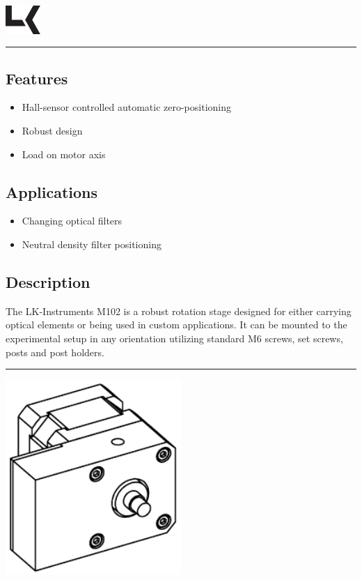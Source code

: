 \documentclass[a4paper, final, 12pt, oneside]{scrartcl}
\numberwithin{equation}{section}
\numberwithin{table}{section}
\numberwithin{figure}{section}
\begin{document}
\thispagestyle{empty}
\includegraphics[width=0.1\textwidth]{../general/logo_black.pdf}
\hfill {\Huge \textbf{\textsf{\productName}}} \hfill {\Huge \textbf{\textsf{\productNumber}}}\\
\noindent\rule{\textwidth}{0.4pt}

\begin{multicols}{2}
\subsection*{Features}
\begin{itemize}
  \item[] Hall-sensor controlled automatic zero-positioning
  \item[] Robust design
  \item[] Load on motor axis
\end{itemize}
\FloatBarrier

\subsection*{Applications}
\begin{itemize}
  \item[] Changing optical filters
  \item[] Neutral density filter positioning
\end{itemize}
\FloatBarrier

\subsection*{Description}
The LK-Instruments M102 is a robust rotation stage designed for either carrying optical elements or being used in custom applications. It can be mounted to the experimental setup in any orientation utilizing standard M6 screws, set screws, posts and post holders.
\end{multicols}
\noindent\rule{\textwidth}{0.4pt}
\vspace*{0.5cm}

\centerline{\includegraphics[width=0.5\textwidth]{./drawings/M102_iso.pdf}}
\end{document}
